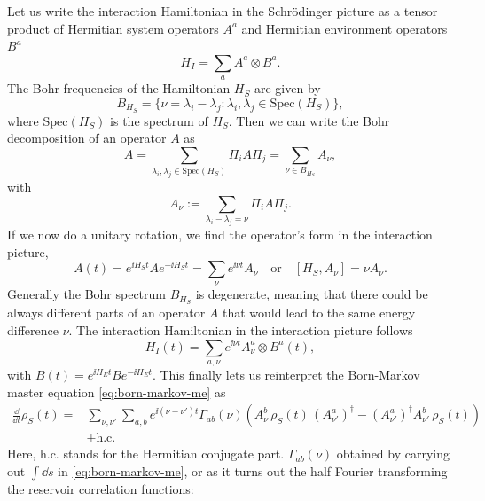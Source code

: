 Let us write the interaction Hamiltonian in the Schrödinger picture as a tensor product of Hermitian system operators $A^a$ and Hermitian environment operators $B^a$
\begin{equation}
    H_I = \sum_a A^a \otimes B^a.
\end{equation}
The Bohr frequencies of the Hamiltonian $H_S$ are given by 
\begin{equation}
    B_{H_S} = \{\nu = \lambda_i - \lambda_j : \lambda_i,\lambda_j \in \mathrm{Spec}(H_S)\},
\end{equation}
where $\mathrm{Spec}(H_S)$ is the spectrum of $H_S$. Then we can write the Bohr decomposition of an operator $A$ as
\begin{equation}
    \label{eq:bohr-decomp}
    A = \sum_{\lambda_i, \lambda_j \in \mathrm{Spec}(H_S)} \Pi_i A \Pi_j = \sum_{\nu \in B_{H_S}} A_\nu,
\end{equation}
with
\begin{equation}
    A_\nu := \sum_{\lambda_i - \lambda_j = \nu} \Pi_i A \Pi_j.
\end{equation}
If we now do a unitary rotation, we find the operator's form in the interaction picture, 
\begin{equation}
    A(t) = e^{\ii H_S t} A e^{-\ii H_S t} = \sum_\nu e^{\ii \nu t} A_\nu \quad\text{or}\quad [H_S, A_\nu] = \nu A_\nu.
\end{equation}
Generally the Bohr spectrum $B_{H_S}$ is degenerate, meaning that there could be always different parts of an operator $A$ that would lead to the same energy difference $\nu$. The interaction Hamiltonian in the interaction picture follows
\begin{equation}
    H_I(t) = \sum_{a, \nu} e^{\ii \nu t} A^a_\nu \otimes B^a(t),
\end{equation}
with $B(t) = e^{\ii H_E t} B e^{-\ii H_E t}$. This finally lets us reinterpret the Born-Markov master equation \eqref{eq:born-markov-me} as
\begin{equation}
    \label{eq:bohr-decomposed-born-markov-me}
    \begin{split}
        \frac{\dd}{\dd t}\rho_S(t) =& \sum_{\nu, \nu'}\sum_{a, b}e^{\ii(\nu - \nu')t}\Gamma_{ab}(\nu)\left(A^b_\nu\, \rho_S(t)\, (A^{a}_{\nu'})^\dagger - (A^a_{\nu'})^\dagger A_{\nu'}^b\, \rho_S(t)\right) \\
        &+ \text{h.c.}
    \end{split}
\end{equation}
Here, h.c. stands for the Hermitian conjugate part. $\Gamma_{ab}(\nu)$ obtained by carrying out $\int \dd s$ in \eqref{eq:born-markov-me}, or as it turns out the half Fourier transforming the reservoir correlation functions:
